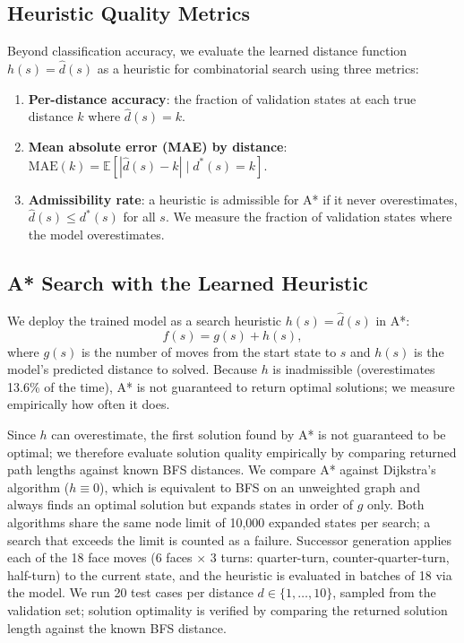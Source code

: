 \documentclass[11pt]{article}
\begin{document}
\subsection{Heuristic Quality Metrics}

Beyond classification accuracy, we evaluate the learned distance function
$h(s) = \hat{d}(s)$ as a heuristic for combinatorial search using three metrics:

\begin{enumerate}
  \item \textbf{Per-distance accuracy}: the fraction of validation states at
    each true distance $k$ where $\hat{d}(s) = k$.
  \item \textbf{Mean absolute error (MAE) by distance}:
    $\text{MAE}(k) = \mathbb{E}[|\hat{d}(s) - k| \mid d^*(s) = k]$.
  \item \textbf{Admissibility rate}: a heuristic is admissible for A* if it
    never overestimates, $\hat{d}(s) \leq d^*(s)$ for all $s$.
    We measure the fraction of validation states where the model overestimates.
\end{enumerate}

\subsection{A* Search with the Learned Heuristic}

We deploy the trained model as a search heuristic $h(s) = \hat{d}(s)$ in A*:
\begin{equation}
  f(s) = g(s) + h(s),
\end{equation}
where $g(s)$ is the number of moves from the start state to $s$ and $h(s)$
is the model's predicted distance to solved. Because $h$ is inadmissible
(overestimates 13.6\% of the time), A* is not guaranteed to return optimal
solutions; we measure empirically how often it does.

Since $h$ can overestimate, the first solution found by A* is not guaranteed
to be optimal; we therefore evaluate solution quality empirically by comparing
returned path lengths against known BFS distances.
We compare A* against Dijkstra's algorithm ($h \equiv 0$), which is equivalent
to BFS on an unweighted graph and always finds an optimal solution but expands
states in order of $g$ only. Both algorithms share the same node limit of
10,000 expanded states per search; a search that exceeds the limit is counted
as a failure. Successor generation applies each of the 18 face moves (6 faces $\times$ 3 turns: quarter-turn, counter-quarter-turn, half-turn) to the
current state, and the heuristic is evaluated in batches of 18 via the model.
We run 20 test cases per distance $d \in \{1, \ldots, 10\}$, sampled from the
validation set; solution optimality is verified by comparing the returned
solution length against the known BFS distance.
\end{document}
